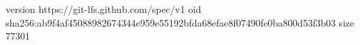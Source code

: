 version https://git-lfs.github.com/spec/v1
oid sha256:ab9f4af45088982674344e959e55192bfda68efae8f07490fe0ba800d53f3b03
size 77301
